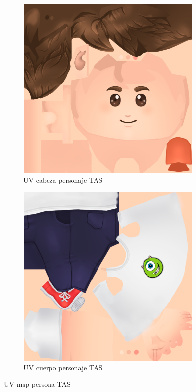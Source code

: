 \documentclass[12pt, a4paper,twoside,titlepage]{book}
\begin{document}
 \begin{figure}
\centering
\begin{subfigure}{.5\textwidth}
  \centering
  \includegraphics[width=.95\linewidth]{TGF/Artes/TAS_head.png}
  \caption{UV cabeza personaje TAS}
\end{subfigure}%
\begin{subfigure}{.5\textwidth}
  \centering
  \includegraphics[width=.95\linewidth]{TGF/Artes/TAS_body.png}
  \caption{UV cuerpo personaje TAS}
\end{subfigure}
\caption{UV map persona TAS}
\label{fig:ArtesTAS1}
\end{figure}
\end{document}
